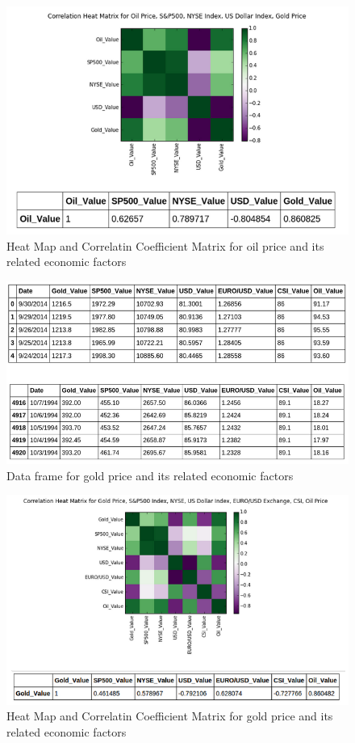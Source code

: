 \documentclass[runningheads]{llncs}
\begin{document}
\begin{figure}
\centering
\includegraphics[width=\textwidth]{HeatMap_Oil_Daily.png}
\caption{Heat Map and Correlatin Coefficient Matrix for oil price and its related economic factors}
\label{fig:HeatMap_Oil_Daily.png}
\end{figure}

\begin{figure}
\centering
\includegraphics[width=\textwidth]{DataMatrices_Gold_Daily.png}
\caption{Data frame for gold price and its related economic factors}
\label{fig:DataMatrices_Gold_Daily.png}
\end{figure}

\begin{figure}
\centering
\includegraphics[width=\textwidth]{HeatMap_Gold_Daily.png}
\caption{Heat Map and Correlatin Coefficient Matrix for gold price and its related economic factors}
\label{fig:HeatMap_Gold_Daily.png}
\end{figure}
\end{document}
